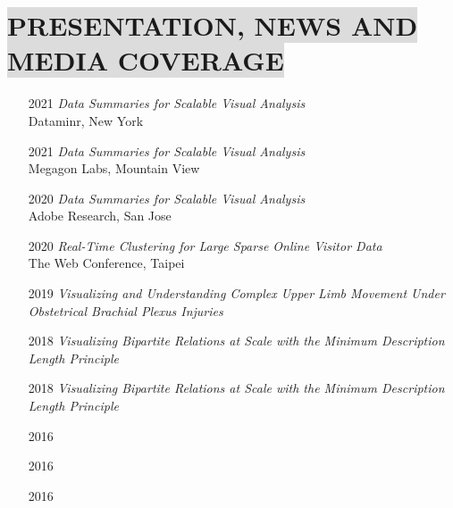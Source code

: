 \section*{
    \colorbox{gainsboro}{PRESENTATION, NEWS AND MEDIA COVERAGE}
}
\begin{itemize}[leftmargin=16.5mm,labelsep=9mm,noitemsep]
    \item[2021] \textit{Data Summaries for Scalable Visual Analysis} \\ Dataminr, New York
    \item[2021] \textit{Data Summaries for Scalable Visual Analysis} \\ Megagon Labs, Mountain View
    \item[2020] \textit{Data Summaries for Scalable Visual Analysis} \\ Adobe Research, San Jose
    \item[2020] \textit{Real-Time Clustering for Large Sparse Online Visitor Data} \\ The Web Conference, Taipei
    \item[2019] \textit{Visualizing and Understanding Complex Upper Limb Movement Under Obstetrical Brachial Plexus Injuries} \\ 
    \item[2018] \textit{Visualizing Bipartite Relations at Scale with the Minimum Description Length Principle} \\ 
    \item[2018] \textit{Visualizing Bipartite Relations at Scale with the Minimum Description Length Principle} \\  
    \item[2016]  
    \item[2016] \begin{CJK}{UTF8}{gbsn}
        \end{CJK} 
    \item[2016] \begin{CJK}{UTF8}{gbsn}
        \end{CJK}
\end{itemize}